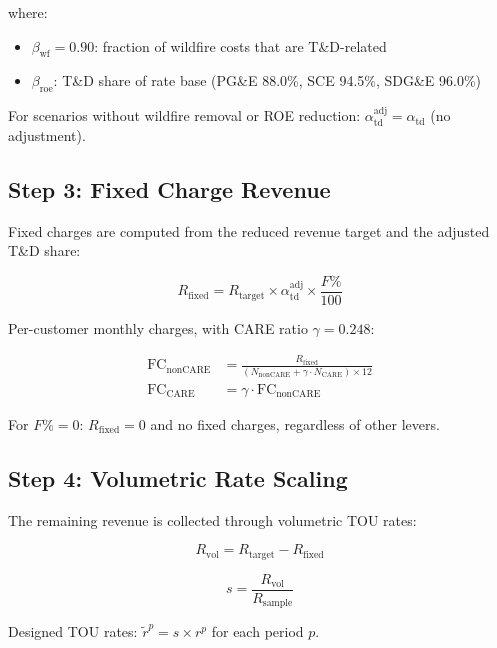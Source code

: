 \documentclass[11pt]{article}
\begin{document}
where:
\begin{itemize}
\item $\beta_{\text{wf}} = 0.90$: fraction of wildfire costs that are T\&D-related
\item $\beta_{\text{roe}}$: T\&D share of rate base (PG\&E 88.0\%, SCE 94.5\%, SDG\&E 96.0\%)
\end{itemize}

For scenarios without wildfire removal or ROE reduction: $\alpha_{\text{td}}^{\text{adj}} = \alpha_{\text{td}}$ (no adjustment).

\subsection{Step 3: Fixed Charge Revenue}

Fixed charges are computed from the reduced revenue target and the adjusted T\&D share:

\begin{equation}
\boxed{R_{\text{fixed}} = R_{\text{target}} \times \alpha_{\text{td}}^{\text{adj}} \times \frac{F\%}{100}}
\end{equation}

Per-customer monthly charges, with CARE ratio $\gamma = 0.248$:

\begin{align}
\text{FC}_{\text{nonCARE}} &= \frac{R_{\text{fixed}}}{(N_{\text{nonCARE}} + \gamma \cdot N_{\text{CARE}}) \times 12} \\
\text{FC}_{\text{CARE}} &= \gamma \cdot \text{FC}_{\text{nonCARE}}
\end{align}

For $F\% = 0$: $R_{\text{fixed}} = 0$ and no fixed charges, regardless of other levers.

\subsection{Step 4: Volumetric Rate Scaling}

The remaining revenue is collected through volumetric TOU rates:

\begin{equation}
R_{\text{vol}} = R_{\text{target}} - R_{\text{fixed}}
\end{equation}

\begin{equation}
\boxed{s = \frac{R_{\text{vol}}}{R_{\text{sample}}}}
\end{equation}

Designed TOU rates: $\tilde{r}^p = s \times r^p$ for each period $p$.
\end{document}
